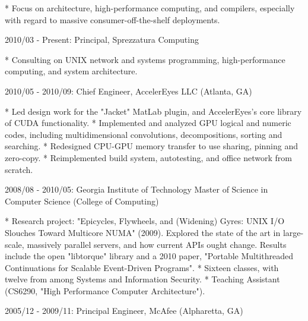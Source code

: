 \documentclass{article}
\begin{document}
* Focus on architecture, high-performance computing, and compilers,
  especially with regard to massive consumer-off-the-shelf deployments.

2010/03 - Present: Principal, Sprezzatura Computing

* Consulting on UNIX network and systems programming, high-performance
  computing, and system architecture.

2010/05 - 2010/09: Chief Engineer, AccelerEyes LLC (Atlanta, GA)

* Led design work for the "Jacket" MatLab plugin, and AccelerEyes's core
  library of CUDA functionality.
* Implemented and analyzed GPU logical and numeric codes, including
  multidimensional convolutions, decompositions, sorting and searching. 
* Redesigned CPU-GPU memory transfer to use sharing, pinning and zero-copy.
* Reimplemented build system, autotesting, and office network from scratch.

2008/08 - 2010/05: Georgia Institute of Technology
Master of Science in Computer Science (College of Computing)

* Research project: "Epicycles, Flywheels, and (Widening) Gyres: UNIX I/O
  Slouches Toward Multicore NUMA" (2009). Explored the state of the art in
  large-scale, massively parallel servers, and how current APIs ought
  change. Results include the open "libtorque" library and a 2010 paper,
  "Portable Multithreaded Continuations for Scalable Event-Driven Programs".
* Sixteen classes, with twelve from among Systems and Information Security.
* Teaching Assistant (CS6290, "High Performance Computer Architecture").

2005/12 - 2009/11: Principal Engineer, McAfee (Alpharetta, GA)
\end{document}
